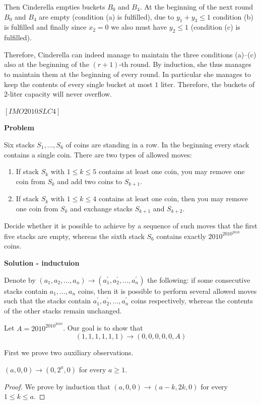 \begin{problem}
 Then Cinderella empties buckets $B_0$ and $B_4$. At the beginning of the next round $B_0$ and $B_4$ are empty (condition (a) is fulﬁlled), due to $y_1+y_3 \le 1$ condition (b) is fulﬁlled and ﬁnally since $x_2 = 0$ we also must have $y_2 \le 1$ (condition (c) is fulﬁlled). 
 
 Therefore, Cinderella can indeed manage to maintain the three conditions (a)–(c) also at the beginning of the $(r + 1)$-th round. By induction, she thus manages to maintain them at the beginning of every round. In particular she manages to keep the contents of every single bucket at most $1$ liter. Therefore, the buckets of $2$-liter capacity will never overﬂow.


\end{problem}

\begin{problem}
$[IMO2010SLC4]$

\textbf{Problem}

Six stacks $S_1,\dots,S_6$ of coins are standing in a row. In the beginning every stack contains a single coin. There are two types of allowed moves: 
\begin{enumerate}
\item \label{move1} If stack $S_k$ with $1\le k \le 5$ contains at least one coin, you may remove one coin from $S_k$ and add two coins to $S_{k+1}$.
\item If stack $S_k$ with $1 \le k \le 4$ contains at least one coin, then you may remove one coin from $S_k$ and exchange stacks $S_{k+1}$ and $S_{k+2}$. 
 \end{enumerate}
 Decide whether it is possible to achieve by a sequence of such moves that the ﬁrst ﬁve stacks are empty, whereas the sixth stack $S_6$ contains exactly $2010^{2010^{2010}}$ coins.


\textbf{Solution - inductuion }

Denote by $(a_1,a_2,\dots,a_n)  \rightarrow (a_1^\prime,a_2^\prime,\dots,a_n^\prime)$ the following: if some consecutive stacks contain $a_1,\dots,a_n$ coins, then it is possible to perform several allowed moves such that the stacks contain $a_1^\prime,a_2^\prime,\dots,a_n^\prime$ coins respectively, whereas the contents of the other stacks remain unchanged. 

Let $A=2010^{2010^{2010}}$. Our goal is to show that $$(1,1,1,1,1,1) \rightarrow (0,0,0,0,0,A)$$

First we prove two auxiliary observations. 
\begin{lemma}
\label{lemma1}
$(a,0,0)\rightarrow (0,2^a,0)$ for every $a\ge 1$. 
\end{lemma}
\begin{proof}
We prove by induction that $(a,0,0) \rightarrow (a-k,2k,0)$ for every $1\le k \le a$. 


\end{proof}
\end{problem}
